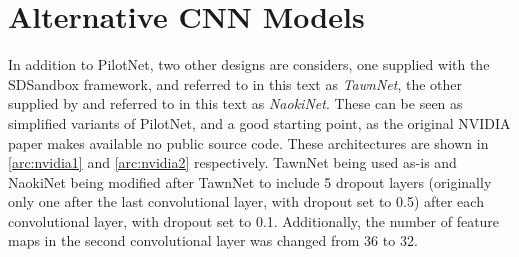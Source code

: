 


\section{Alternative CNN Models}

In addition to PilotNet, two other designs are considers, one supplied with the SDSandbox framework, and referred to in this text as \textit{TawnNet}, the other supplied by \cite{Naoki2016} and referred to in this text as \textit{NaokiNet}. These can be seen as simplified variants of PilotNet, and a good starting point, as the original NVIDIA paper makes available no public source code. These architectures are shown in \ref{arc:nvidia1} and \ref{arc:nvidia2} respectively. TawnNet being used as-is and NaokiNet being modified after TawnNet to include 5 dropout layers (originally only one after the last convolutional layer, with dropout set to 0.5) after each convolutional layer, with dropout set to 0.1. Additionally, the number of feature maps in the second convolutional layer was changed from 36 to 32.


